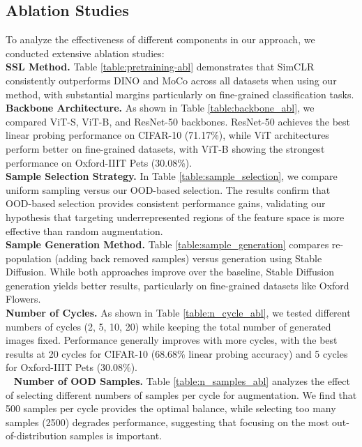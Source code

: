 \subsection{Ablation Studies}
\noindent
To analyze the effectiveness of different components in our approach, we conducted extensive ablation studies:\\
\noindent
\textbf{SSL Method.} Table \ref{table:pretraining-abl} demonstrates that SimCLR consistently outperforms DINO and MoCo across all datasets when using our method, with substantial margins particularly on fine-grained classification tasks.\\
\noindent
\textbf{Backbone Architecture.} As shown in Table \ref{table:backbone_abl}, we compared ViT-S, ViT-B, and ResNet-50 backbones. ResNet-50 achieves the best linear probing performance on CIFAR-10 (71.17\%), while ViT architectures perform better on fine-grained datasets, with ViT-B showing the strongest performance on Oxford-IIIT Pets (30.08\%).\\
\noindent
\textbf{Sample Selection Strategy.} In Table \ref{table:sample_selection}, we compare uniform sampling versus our OOD-based selection. The results confirm that OOD-based selection provides consistent performance gains, validating our hypothesis that targeting underrepresented regions of the feature space is more effective than random augmentation.\\
\noindent
\textbf{Sample Generation Method.} Table \ref{table:sample_generation} compares re-population (adding back removed samples) versus generation using Stable Diffusion. While both approaches improve over the baseline, Stable Diffusion generation yields better results, particularly on fine-grained datasets like Oxford Flowers.\\
\noindent
\textbf{Number of Cycles.} As shown in Table \ref{table:n_cycle_abl}, we tested different numbers of cycles (2, 5, 10, 20) while keeping the total number of generated images fixed. Performance generally improves with more cycles, with the best results at 20 cycles for CIFAR-10 (68.68\% linear probing accuracy) and 5 cycles for Oxford-IIIT Pets (30.08\%).\\\
\noindent
\textbf{Number of OOD Samples.} Table \ref{table:n_samples_abl} analyzes the effect of selecting different numbers of samples per cycle for augmentation. We find that 500 samples per cycle provides the optimal balance, while selecting too many samples (2500) degrades performance, suggesting that focusing on the most out-of-distribution samples is important.